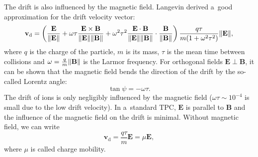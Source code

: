			The drift is also influenced by the magnetic field. Langevin derived a~good approximation for the drift velocity vector:
				\begin{equation}
					\label{eq:drift}
					\mathbf{v}_\text{d} = \left(\frac{\mathbf{E}}{\norm{\mathbf{E}}} + \omega\tau\frac{\mathbf{E}\times\mathbf{B}}{\norm{\mathbf{E}}\norm{\mathbf{B}}} + \omega^2\tau^2\frac{\mathbf{E}\cdot\mathbf{B}}{\norm{\mathbf{E}}\norm{\mathbf{B}}}\cdot \frac{\mathbf{B}}{\norm{\mathbf{B}}}\right) \frac{q\tau}{m(1+\omega^2\tau^2)}\norm{\mathbf{E}},
				\end{equation}
			where $q$ is the charge of the particle, $m$ is its mass, $\tau$ is the mean time between collisions and $\omega = \frac{q}{m}\norm{\mathbf{B}}$ is the Larmor frequency. For orthogonal fields $\mathbf{E}\perp\mathbf{B}$, it can be shown that the magnetic field bends the direction of the drift by the so\nobreakdash-called Lorentz angle:
				\begin{equation}
					\label{eq:lorentz}
					\tan\psi = -\omega\tau.
				\end{equation}
			The drift of ions is only negligibly influenced by the magnetic field ($\omega\tau\sim10^{-4}$ is small due to the low drift velocity). In a~standard \ac{TPC}, $\mathbf{E}$ is parallel to $\mathbf{B}$ and the influence of the magnetic field on the drift is minimal. Without magnetic field, we can write
				\begin{equation}
					\mathbf{v}_\text{d} = \frac{q\tau}{m} \mathbf{E} = \mu \mathbf{E},
				\end{equation}
			where $\mu$ is called charge mobility.
			

